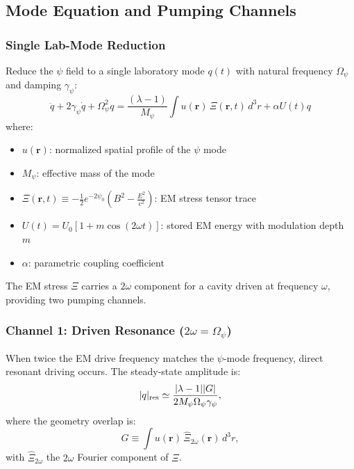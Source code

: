 \subsection{Mode Equation and Pumping Channels}\label{sec:mode-equation}

\subsubsection{Single Lab-Mode Reduction}

Reduce the $\psi$ field to a single laboratory mode $q(t)$ with natural 
frequency $\Omega_\psi$ and damping $\gamma_\psi$:
\begin{equation}
\boxed{
\ddot{q} + 2\gamma_\psi\dot{q} + \Omega_\psi^2 q = \frac{(\lambda - 1)}{M_\psi}\int u(\mathbf{r})\,\Xi(\mathbf{r},t)\,d^3r + \alpha U(t)q
}
\label{eq:driven-mode}
\end{equation}
where:
\begin{itemize}
\item $u(\mathbf{r})$: normalized spatial profile of the $\psi$ mode
\item $M_\psi$: effective mass of the mode
\item $\Xi(\mathbf{r},t) \equiv -\frac{1}{2}e^{-2\psi_0}\left(B^2 - \frac{E^2}{c^2}\right)$: EM stress tensor trace
\item $U(t) = U_0[1 + m\cos(2\omega t)]$: stored EM energy with modulation depth $m$
\item $\alpha$: parametric coupling coefficient
\end{itemize}

The EM stress $\Xi$ carries a $2\omega$ component for a cavity driven at 
frequency $\omega$, providing two pumping channels.

\subsubsection{Channel 1: Driven Resonance ($2\omega = \Omega_\psi$)}

When twice the EM drive frequency matches the $\psi$-mode frequency, 
direct resonant driving occurs. The steady-state amplitude is:
\begin{equation}
|q|_{\rm res} \simeq \frac{|\lambda - 1||G|}{2M_\psi\Omega_\psi\gamma_\psi},
\label{eq:driven-amplitude}
\end{equation}
where the geometry overlap is:
\begin{equation}
G \equiv \int u(\mathbf{r})\,\hat{\Xi}_{2\omega}(\mathbf{r})\,d^3r,
\end{equation}
with $\hat{\Xi}_{2\omega}$ the $2\omega$ Fourier component of $\Xi$.

